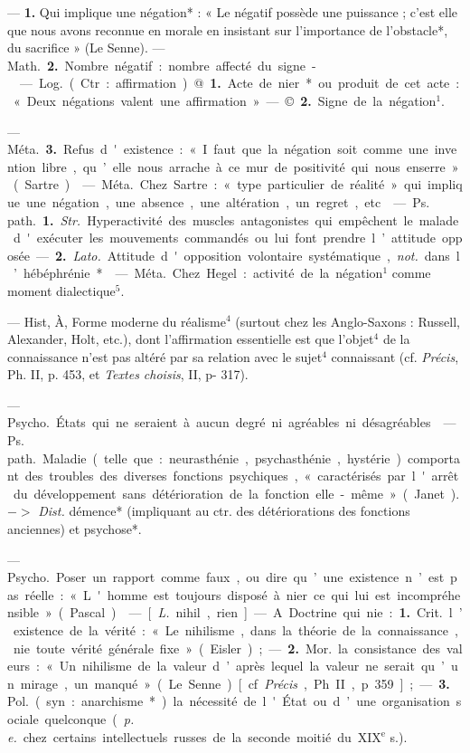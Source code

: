 \begin{itemize}[leftmargin=1cm, label=, itemsep=1pt]
 — {\bf 1.} Qui implique une négation* : « Le négatif possède une
puissance ; c’est elle que nous avons
reconnue en morale en insistant
sur l'importance de l’obstacle*, du
sacrifice » (Le Senne). — \si{Math.} {\bf 2.}
Nombre négatif : nombre affecté du
signe -.

 — \si{Log.} (Ctr. : affirmation).
@. {\bf 1.} Acte de nier* ou produit de
cet acte : « Deux négations valent
une affirmation » — ©. {\bf 2.} Signe
de la négation$^1$.

— \si{Méta.} {\bf 3.} Refus d'existence :
« I faut que la négation soit comme
une invention libre, qu’elle nous
arrache à ce mur de positivité qui
nous enserre » (Sartre).

 — \si{Méta.} Chez Sartre : « type
particulier de réalité » qui implique
une négation, une absence, une
altération, un regret, etc.

 — \si{Ps. path.} {\bf 1.} {\it Str.}
Hyperactivité des muscles antagonistes qui empêchent le malade
d'exécuter les mouvements commandés ou lui font prendre l’attitude opposée. — {\bf 2.} {\it Lato.} Attitude
d'opposition volontaire systématique, {\it not.} dans l’hébéphrénie*.

 — \si{Méta.} Chez Hegel : activité de la négation$^1$ comme moment
dialectique$^5$.

 — Hist, À, Forme moderne du réalisme$^4$ (surtout chez les
Anglo-Saxons : Russell, Alexander,
Holt, etc.), dont l'affirmation essentielle est que l'objet$^4$ de la connaissance n’est pas altéré par sa relation
avec le sujet$^4$ connaissant (cf. {\it Précis},
Ph. II, p. 453, et {\it Textes choisis}, II,
p- 317).

 — \si{Psycho.} États qui
ne seraient à aucun degré ni agréables ni désagréables.

 — \si{Ps. path.} Maladie (telle
que : neurasthénie, psychasthénie,
hystérie) comportant des troubles
des diverses fonctions psychiques,
« caractérisés par l'arrêt du développement sans détérioration de la
fonction elle-même » (Janet). $->$
{\it Dist.} démence* (impliquant au ctr.
des détériorations des fonctions anciennes) et psychose*.

 — \si{Psycho.} Poser un rapport
comme faux, ou dire qu’une existence n’est pas réelle : « L'homme
est toujours disposé à nier ce qui lui
est incompréhensible » (Pascal).

 — [{\it L.} nihil, rien] — A. Doctrine qui nie : {\bf 1.} \si{Crit.} l’existence de
la vérité : « Le nihilisme, dans la
théorie de la connaissance, nie toute
vérité générale fixe » (Eisler) ; —
 {\bf 2.} \si{Mor.} la consistance des valeurs :
« ... Un nihilisme de la valeur d’après
lequel la valeur ne serait qu’un
mirage, un manqué » (Le Senne)
[cf. {\it Précis}, Ph. II, p. 359] ; — {\bf 3.} \si{Pol.}
(syn. : anarchisme*) la nécessité de
l'État ou d’une organisation sociale
quelconque ({\it p. e.} chez certains intellectuels russes de la seconde moitié
du {\footnotesize XIX}$^\text{e}$ s.).


\end{itemize}
